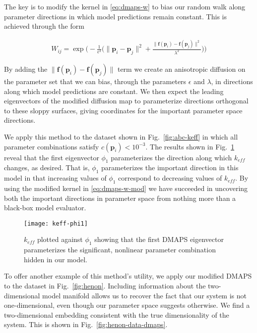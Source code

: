 The key is to modify the kernel in \eqref{eq:dmaps-w} to bias our
random walk along parameter directions in which model predictions
remain constant. This is achieved through the form

\begin{align}
  W_{ij} = \exp\bigg(-\frac{1}{\epsilon^2} \big(\| \mathbf{p}_i - \mathbf{p}_j
  \|^2 + \frac{\|\mathbf{f}(\mathbf{p}_i) - \mathbf{f}(\mathbf{p}_j) \|^2}{\lambda^2} \big) \bigg)
  \label{eq:dmaps-w-mod}
\end{align}

By adding the
$\|\mathbf{f}(\mathbf{p}_i) - \mathbf{f}(\mathbf{p}_j) \|$ term we
create an anisotropic diffusion on the parameter set that we can bias,
through the parameters $\epsilon$ and $\lambda$, in directions along
which model predictions are constant. We then expect the leading
eigenvectors of the modified diffusion map to parameterize directions
orthogonal to these sloppy surfaces, giving coordinates for the
important parameter space directions.

We apply this method to the dataset shown in Fig.~\ref{fig:abc-keff}
in which all parameter combinations satisfy
$c(\mathbf{p}_i) < 10^{-3}$. The results shown in
Fig.~\ref{fig:abc-datadmaps} reveal that the first eigenvector
$\phi_1$ parameterizes the direction along which $k_{eff}$ changes, as
desired. That is, $\phi_1$ parameterizes the important direction in
this model in that increasing values of $\phi_1$ correspond to
decreasing values of $k_{eff}$. By using the modified kernel in
\eqref{eq:dmaps-w-mod} we have succeeded in uncovering both the
important directions in parameter space from nothing more than a
black-box model evaluator.

\begin{figure}[ht!]
  \centering
  \texttt{[image: keff-phi1]}
  \caption[Plot of effective parameter vs. a DMAPS
  coordinate]{$k_{eff}$ plotted against $\phi_1$ showing that the
    first DMAPS eigenvector parameterizes the significant, nonlinear
    parameter combination hidden in our
    model. \label{fig:abc-datadmaps} }
\end{figure}

\clearpage

To offer another example of this method's utility, we apply our
modified DMAPS to the dataset in Fig.~\ref{fig:henon}. Including
information about the two-dimensional model manifold allows us to
recover the fact that our system is not one-dimensional, even though
our parameter space suggests otherwise. We find a two-dimensional
embedding consistent with the true dimensionality of the system. This
is shown in Fig.~\ref{fig:henon-data-dmaps}.


